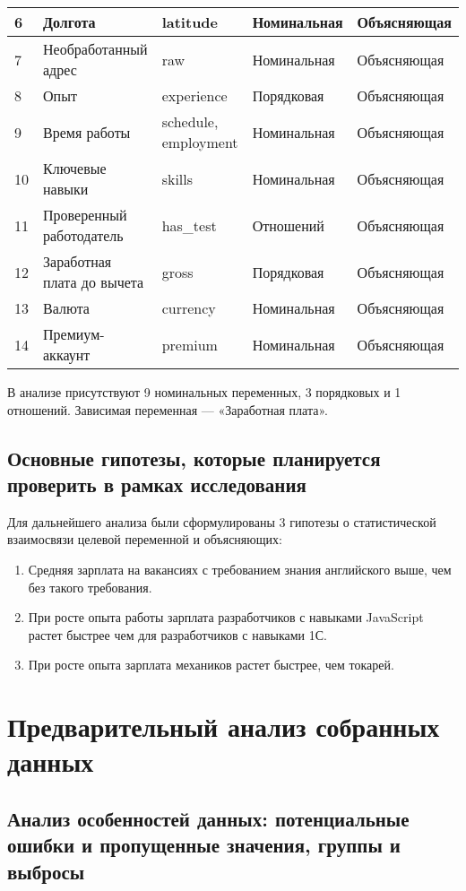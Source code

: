\documentclass[12pt]{article}
\begin{document}
\begin{longtable}{|l|l|l|l|l|}
6 & Долгота & latitude  & Номинальная & Объясняющая\\ \hline
7 & Необработанный адрес & raw & Номинальная & Объясняющая\\ \hline
8 & Опыт & experience & Порядковая & Объясняющая\\ \hline
9 & Время работы & schedule, employment & Номинальная & Объясняющая\\ \hline
10 & Ключевые навыки & skills & Номинальная & Объясняющая\\ \hline
11 & Проверенный работодатель& has\_test & Отношений & Объясняющая\\ \hline
12 & Заработная плата до вычета& gross & Порядковая & Объясняющая\\ \hline
13 & Валюта & currency & Номинальная & Объясняющая\\ \hline
14 & Премиум-аккаунт & premium & Номинальная & Объясняющая\\ \hline

\end{longtable}

В анализе присутствуют 9 номинальных переменных, 3 порядковых и 1 отношений. Зависимая переменная --- «Заработная плата».
\subsection{Основные гипотезы, которые планируется проверить в рамках исследования}

Для дальнейшего анализа были сформулированы 3 гипотезы о статистической взаимосвязи целевой переменной и объясняющих:
\begin{enumerate}
\item Средняя зарплата на вакансиях с требованием знания английского выше, чем без такого требования. 
\item  При росте опыта работы зарплата разработчиков с навыками JavaScript растет быстрее чем для разработчиков с навыками 1С.
\item  При росте опыта зарплата механиков растет быстрее, чем токарей.
\end{enumerate}
\section{Предварительный анализ собранных данных}
\subsection{Анализ особенностей данных: потенциальные ошибки и пропущенные значения,
группы и выбросы}
\end{document}
